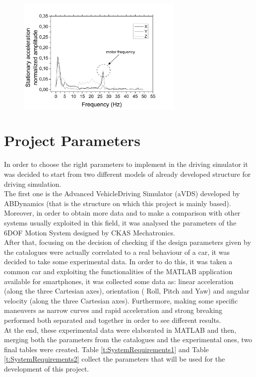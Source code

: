 \documentclass[10.5pt, twocolumn]{article}
\begin{document}
\begin{figure}[h!]
	\centering
	\includegraphics[width=8cm]{Images/FFTStationary}
\end{figure}

\section{Project Parameters}
In order to choose the right parameters to implement in the driving simulator it was decided to start from two different models of already developed structure for driving simulation.\\
The first one is the Advanced VehicleDriving Simulator (aVDS) developed by ABDynamics (that is the structure on which this project is mainly based). Moreover, in order to obtain more data and to make a comparison with other systems usually exploited in this field, it was analysed the parameters of the 6DOF Motion System designed by CKAS Mechatronics.\\
After that, focusing on the decision of checking if the design parameters given by the catalogues were actually correlated to a real behaviour of a car, it was decided to take some experimental data. In order to do this, it was taken a common car and exploiting the functionalities of the MATLAB application available for smartphones, it was collected some data as: linear acceleration (along the three Cartesian axes), orientation ( Roll, Pitch and Yaw) and angular velocity (along the three Cartesian axes). Furthermore, making some specific maneuvers as narrow curves and rapid acceleration and strong breaking performed both separated and together in order to see different results.\\
At the end, these experimental data were elaborated in MATLAB and then, merging both the parameters from the catalogues and the experimental ones, two final tables were created. Table \ref{t:SystemRequirements1} and Table \ref{t:SystemRequirements2} collect the parameters that will be used for the development of this project. 
\end{document}
